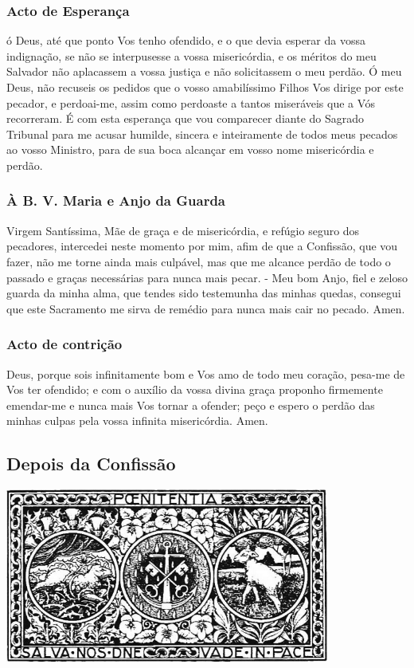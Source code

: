 \subsubsection{Acto de Esperança}

 ó Deus, até que ponto Vos tenho ofendido, e o que devia esperar da vossa indignação, se não se interpusesse a vossa misericórdia, e os méritos do meu Salvador não aplacassem a vossa justiça e não solicitassem o meu perdão. Ó meu Deus, não recuseis os pedidos que o vosso amabilíssimo Filhos Vos dirige por este pecador, e perdoai-me, assim como perdoaste a tantos miseráveis que a Vós recorreram. É com esta esperança que vou comparecer diante do Sagrado Tribunal para me acusar humilde, sincera e inteiramente de todos meus pecados ao vosso Ministro, para de sua boca alcançar em vosso nome misericórdia e perdão.

\subsubsection{À B. V. Maria e Anjo da Guarda}
 Virgem Santíssima, Mãe de graça e de misericórdia, e refúgio seguro dos pecadores, intercedei neste momento por mim, afim de que a Confissão, que vou fazer, não me torne ainda mais culpável, mas que me alcance perdão de todo o passado e graças necessárias para nunca mais pecar. - Meu bom Anjo, fiel e zeloso guarda da minha alma, que tendes sido testemunha das minhas quedas, consegui que este Sacramento me sirva de remédio para nunca mais cair no pecado. Amen.

\subsubsection{Acto de contrição}

 Deus, porque sois infinitamente bom e Vos amo de todo meu coração, pesa-me de Vos ter ofendido; e com o auxílio da vossa divina graça proponho firmemente emendar-me e nunca mais Vos tornar a ofender; peço e espero o perdão das minhas culpas pela vossa infinita misericórdia. Amen.

\subsection{Depois da Confissão}

\begin{nscenter}
\includegraphics[width=0.8\textwidth,height=0.8\textheight,keepaspectratio]{media/penitencia}
\end{nscenter}

